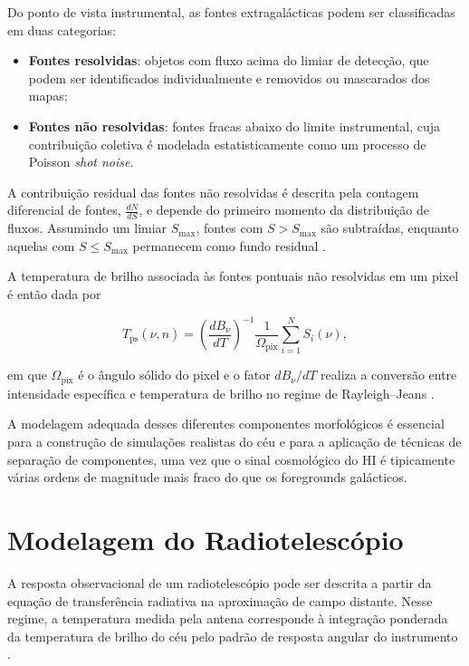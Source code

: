 Do ponto de vista instrumental, as fontes extragalácticas podem ser classificadas em duas categorias:

\begin{itemize}
    \item \textbf{Fontes resolvidas}: objetos com fluxo acima do limiar de detecção, que podem ser identificados individualmente e removidos ou mascarados dos mapas;
    \item \textbf{Fontes não resolvidas}: fontes fracas abaixo do limite instrumental, cuja contribuição coletiva é modelada estatisticamente como um processo de Poisson \textit{shot noise}.
\end{itemize}

A contribuição residual das fontes não resolvidas é descrita pela contagem diferencial de fontes, \( \frac{dN}{dS} \), e depende do primeiro momento da distribuição de fluxos. Assumindo um limiar \( S_{\mathrm{max}} \), fontes com \( S > S_{\mathrm{max}} \) são subtraídas, enquanto aquelas com \( S \le S_{\mathrm{max}} \) permanecem como fundo residual \cite{EEL2018}.

A temperatura de brilho associada às fontes pontuais não resolvidas em um pixel é então dada por

\begin{equation}
T_{\mathrm{ps}}(\nu,\hat{n}) =
\left( \frac{dB_\nu}{dT} \right)^{-1}
\frac{1}{\Omega_{\mathrm{pix}}}
\sum_{i=1}^{N} S_i(\nu),
\end{equation}

em que \( \Omega_{\mathrm{pix}} \) é o ângulo sólido do pixel e o fator \( dB_\nu/dT \) realiza a conversão entre intensidade específica e temperatura de brilho no regime de Rayleigh--Jeans \cite{EEL2018}.

A modelagem adequada desses diferentes componentes morfológicos é essencial para a construção de simulações realistas do céu e para a aplicação de técnicas de separação de componentes, uma vez que o sinal cosmológico do HI é tipicamente várias ordens de magnitude mais fraco do que os foregrounds galácticos.


\section{Modelagem do Radiotelescópio}

A resposta observacional de um radiotelescópio pode ser descrita a partir da equação de transferência radiativa na aproximação de campo distante. Nesse regime, a temperatura medida pela antena corresponde à integração ponderada da temperatura de brilho do céu pelo padrão de resposta angular do instrumento \cite{sasao2009_radioantennas}.

